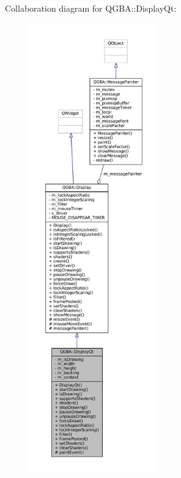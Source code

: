 Collaboration diagram for Q\+G\+BA\+:\+:Display\+Qt\+:
\nopagebreak
\begin{figure}[H]
\begin{center}
\leavevmode
\includegraphics[height=550pt]{class_q_g_b_a_1_1_display_qt__coll__graph}
\end{center}
\end{figure}
